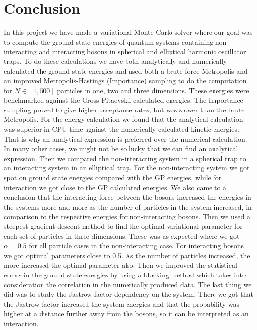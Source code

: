 \documentclass[12pt,a4paper,english]{article}
\begin{document}
\section{Conclusion}
\label{sect:Conclusion}
In this project we have made a variational Monte Carlo solver where our goal was to compute the ground state energies of quantum systems containing non-interacting and interacting bosons in spherical and elliptical harmonic oscillator traps. To do these calculations we have both analytically and numerically calculated the ground state energies and used both a brute force Metropolis and an improved Metropolis-Hastings (Importance) sampling to do the computation for $N\in[1,500]$ particles in one, two and three dimensions. These energies were benchmarked against the Gross-Pitaevskii calculated energies. The Importance sampling proved to give higher acceptance rates, but was slower than the brute Metropolis. For the energy calculation we found that the analytical calculation was superior in CPU time against the numerically calculated kinetic energies. That is why an analytical expression is preferred over the numerical calculation. In many other cases, we might not be so lucky that we can find an analytical expression. Then we compared the non-interacting system in a spherical trap to an interacting system in an elliptical trap. For the non-interacting system we got spot on ground state energies compared with the GP energies, while for interaction we got close to the GP calculated energies. We also came to a conclusion that the interacting force between the bosons increased the energies in the systems more and more as the number of particles in the system increased, in comparison to the respective energies for non-interacting bosons. Then we used a steepest gradient descent method to find the optimal variational parameter for each set of particles in three dimensions. These was as expected where we got $\alpha=0.5$ for all particle cases in the non-interacting case. For interacting bosons we got optimal parameters close to 0.5. As the number of particles increased, the more increased the optimal parameter also. Then we improved the statistical errors in the ground state energies by using a blocking method which takes into consideration the correlation in the numerically produced data. The last thing we did was to study the Jastrow factor dependency on the system. There we got that the Jastrow factor increased the system energies and that the probability was higher at a distance further away from the bosons, so it can be interpreted as an interaction.
\end{document}
